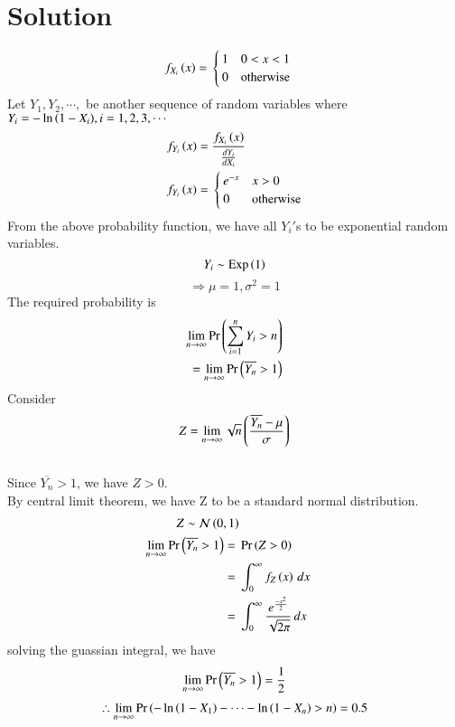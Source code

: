 \documentclass[journal,12pt,twocolumn]{IEEEtran}
\begin{document}
\section*{Solution}
\begin{align*}
f_{X_{i}}\left(x\right) ={}&\begin{cases}
1 & 0<x<1\\
0 & \text{otherwise}
\end{cases}
\end{align*}
Let $Y_{1},Y_{2},\cdots,$ be another sequence of random variables where $Y_{i} = -\ln{\ensuremath{\left(1-X_{i}\right)}},  i=1,2,3,\cdots$
\\ 
\begin{align*}
f_{Y_{i}}\left(x\right)={}& \frac{f_{X_{i}}\left(x\right)}{\frac{dY_{i}}{dX_{i}}}\\
f_{Y_{i}}\left(x\right)={}&\begin{cases}
e^{-x} & x>0\\
0 & \text{otherwise}
\end{cases}
\end{align*}
From the above probability function, we have all $Y_{i}'$s to be exponential random variables.\\
$$Y_{i}\sim \text{Exp}\left(1\right)$$
$$\Rightarrow \mu = 1, \sigma^2 = 1$$
The required probability is 
\begin{align}
\lim_{n\to\infty}\Pr\left(\sum_{i=1}^{n}Y_{i}>n\right)\\
=\lim_{n\to\infty}\Pr\left(\overline{Y_{n}}>1\right)
\end{align}
Consider \begin{align}
Z=\lim_{n\to\infty}\sqrt{n}\left(\frac{\overline{Y_{n}}-\mu}{\sigma}\right)
\end{align}
\\ Since $\overline{Y_{n}}>1$, we have $Z>0$.\\
By central limit theorem, we have Z to be a standard normal distribution.
\begin{align}
Z \sim {\mathcal {N}}\left(0 ,1\right)\\
\lim_{n\to\infty}\Pr\left(\overline{Y_{n}}>1\right)={}&\Pr\left(Z>0\right)\\
={}&\int_{0}^{\infty}f_{Z}\left(x\right)\,dx\\
={}&\int_{0}^{\infty}\frac{e^{\frac{-x^2}{2}}}{\sqrt{2\pi}}\,dx\\
\end{align}
solving the guassian integral, we have 
\begin{align}
\lim_{n\to\infty}\Pr\left(\overline{Y_{n}}>1\right)=\frac{1}{2}
\end{align}
\begin{align}
\therefore \lim_{n\to\infty} \Pr\left(-\ln{\ensuremath{\left(1-X_{1}\right)}}-\cdots-\ln{\ensuremath{\left(1-X_{n}\right)}} > n\right)=0.5
\end{align}
\end{document}
